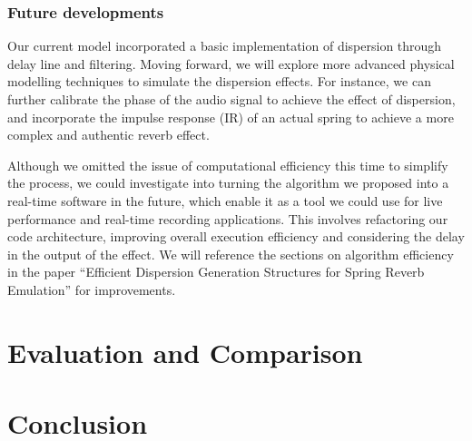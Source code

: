 \documentclass[12pt]{article}
\begin{document}
\newpage
\subsubsection{Future developments}

Our current model incorporated a basic implementation of dispersion through delay line and filtering. Moving forward, we will explore more advanced physical modelling techniques to simulate the dispersion effects. For instance, we can further calibrate the phase of the audio signal to achieve the effect of dispersion, and incorporate the impulse response (IR) of an actual spring to achieve a more complex and authentic reverb effect.

Although we omitted the issue of computational efficiency this time to simplify the process, we could investigate into turning the algorithm we proposed into a real-time software in the future, which enable it as a tool we could use for live performance and real-time recording applications. This involves refactoring our code architecture, improving overall execution efficiency and considering the delay in the output of the effect. We will reference the sections on algorithm efficiency in the paper ``Efficient Dispersion Generation Structures for Spring Reverb Emulation'' for improvements.


\newpage
\section{Evaluation and Comparison}

\newpage
\section{Conclusion}
\end{document}
